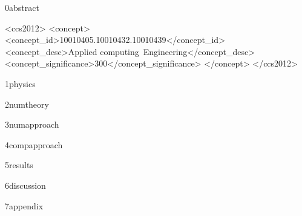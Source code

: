 \documentclass[format=acmtog,12pt,screen=true,review=false,natbib=false,]{acmart}
\begin{document}
{0abstract}

\begin{CCSXML}
<ccs2012>
<concept>
<concept_id>10010405.10010432.10010439</concept_id>
<concept_desc>Applied computing~Engineering</concept_desc>
<concept_significance>300</concept_significance>
</concept>
</ccs2012>
\end{CCSXML}



\maketitle

{1physics}

{2numtheory}

{3numapproach}

{4compapproach}

{5results}

{6discussion}

\medskip
\printbibliography
%

{7appendix}
\end{document}
